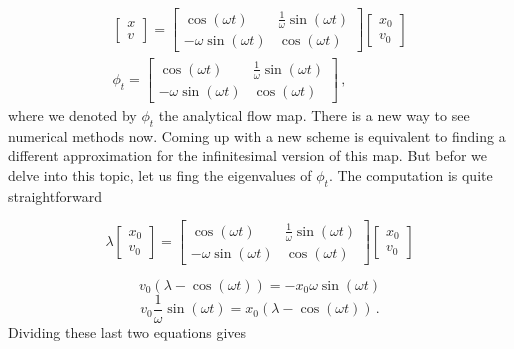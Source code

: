 \documentclass[12pt, class=report, crop=false]{standalone}
\begin{document}
\begin{subequations}
  \begin{align}
  \begin{bmatrix}
    x\\ v
  \end{bmatrix}
  =
  \begin{bmatrix}
    \cos(\omega t) & \frac{1}{\omega} \sin(\omega t)\\
    -\omega \sin(\omega t)  & \cos(\omega t)
  \end{bmatrix}
  \begin{bmatrix}
    x_0\\ v_0
  \end{bmatrix} \\
  \phi_t = \begin{bmatrix}
    \cos(\omega t) & \frac{1}{\omega} \sin(\omega t)\\
    -\omega \sin(\omega t)  & \cos(\omega t)
  \end{bmatrix}\,,
  \end{align}
\end{subequations}
where we denoted by \(\phi_t\) the analytical flow map. There is a new way to see numerical methods now. Coming up with a new scheme is equivalent to finding a different approximation for the infinitesimal version of this map. But befor we delve into this topic, let us fing the eigenvalues of \(\phi_t\). The computation is quite straightforward

\begin{equation*}
  \lambda \begin{bmatrix}
    x_0\\ v_0
  \end{bmatrix}
  =
  \begin{bmatrix}
    \cos(\omega t) & \frac{1}{\omega} \sin(\omega t)\\
    -\omega \sin(\omega t)  & \cos(\omega t)
  \end{bmatrix}
  \begin{bmatrix}
    x_0\\ v_0
  \end{bmatrix}
\end{equation*}

\begin{equation*}
  v_0(\lambda - \cos(\omega t)) = - x_0 \omega \sin(\omega t)
\end{equation*}
\begin{equation*}
  v_0\frac{1}{\omega} \sin(\omega t) = x_0 (\lambda - \cos(\omega t)) \,.
\end{equation*}
Dividing these last two equations gives
\end{document}
